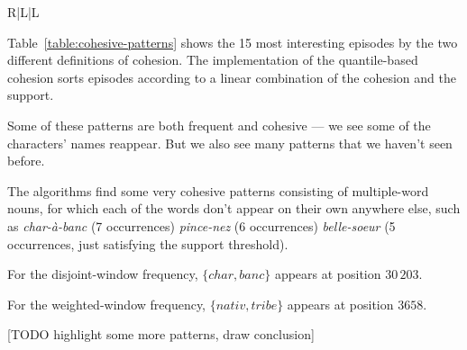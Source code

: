 \begin{table}
\begin{tabulary}{\textwidth}{R|L|L}
\end{tabulary}

\caption{The top 15 patterns mined from~\emph{tolstoy} using cohesion (\textsc{Fci}, minimum support 5, maximal size 5) and quantile-based cohesion (\textsc{Qcsp}, minimum support 7, maximal size 5).}
\label{table:cohesive-patterns}
\end{table}

Table~\ref{table:cohesive-patterns} shows the 15 most interesting episodes by the two different definitions of cohesion. The implementation of the quantile-based cohesion sorts episodes according to a linear combination of the cohesion and the support.

Some of these patterns are both frequent and cohesive --- we see some of the characters' names reappear. But we also see many patterns that we haven't seen before.

The algorithms find some very cohesive patterns consisting of multiple-word nouns, for which each of the words don't appear on their own anywhere else, such as \emph{char-à-banc} (7 occurrences) \emph{pince-nez} (6 occurrences) \emph{belle-soeur} (5 occurrences, just satisfying the support threshold).

For the disjoint-window frequency, $ \{ char,\allowbreak banc \} $ appears at position $ 30\,203 $.

For the weighted-window frequency, $ \{ nativ, tribe \} $ appears at position $ 3658 $.

[TODO highlight some more patterns, draw conclusion]
